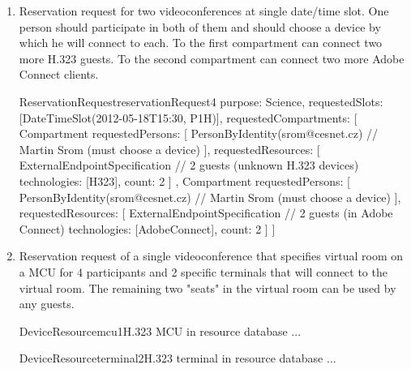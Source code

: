 \begin{enumerate}
\begin{EntityExample}{ReservationRequest}{reservationRequest3}{}
purpose: Science,
requestedSlots: [DateTimeSlot(2012-05-18T15:30, P1H)],
requestedCompartments: [Compartment {
  requestedPersons: [
    PersonByIdentity(srom@cesnet.cz),  // Martin Srom (must choose a device)
    PersonByIdentity(hopet@cesnet.cz), // Petr Holub (must choose a device)
    Person { // Jan Ruzicka (must choose a device)
      name: Jan Ruzicka,
      email: janru@cesnet.cz
    }
  ]
}]
\end{EntityExample}

\item Reservation request for two videoconferences at single date/time slot. One person should participate in both of them and should choose a device by which he will connect to each. To the first compartment can connect two more H.323 guests. To the second compartment can connect two more Adobe Connect clients.

\begin{EntityExample}{ReservationRequest}{reservationRequest4}{}
purpose: Science,
requestedSlots: [DateTimeSlot(2012-05-18T15:30, P1H)],
requestedCompartments: [
  Compartment {
    requestedPersons: [
      PersonByIdentity(srom@cesnet.cz) // Martin Srom (must choose a device)
    ],
    requestedResources: [
      ExternalEndpointSpecification { // 2 guests (unknown H.323 devices)
        technologies: [H323],
        count: 2
      }
    ]
  },
  Compartment {
    requestedPersons: [
      PersonByIdentity(srom@cesnet.cz) // Martin Srom (must choose a device)
    ],
    requestedResources: [
      ExternalEndpointSpecification { // 2 guests (in Adobe Connect)
        technologies: [AdobeConnect],
        count: 2
      }
    ]
  }
]
\end{EntityExample}

\item Reservation request of a single videoconference that specifies virtual room on a MCU for 4 participants and 2 specific terminals that will connect to the virtual room. The remaining two "seats" in the virtual room can be used by any guests.

\begin{EntityExample}{DeviceResource}{mcu1}{H.323 MCU in resource database}
...
\end{EntityExample}

\begin{EntityExample}{DeviceResource}{terminal2}{H.323 terminal in resource database}
...
\end{EntityExample}


\end{enumerate}
